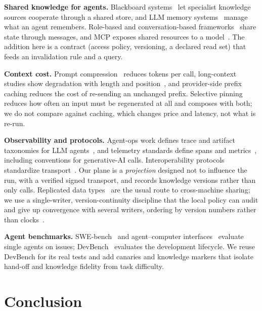 \documentclass[10pt,conference]{IEEEtran}
\theoremstyle{definition}
\begin{document}
\textbf{Shared knowledge for agents.} Blackboard systems~\cite{nii1986blackboard,erman1980hearsay} let
specialist knowledge sources cooperate through a shared store, and LLM memory
systems~\cite{packer2023memgpt,park2023generative} manage what an agent remembers. Role-based and
conversation-based frameworks~\cite{hong2024metagpt,qian2024chatdev,wu2024autogen,li2023camel,chen2024agentverse}
share state through messages, and MCP exposes shared resources to a model~\cite{mcp2024}. The addition here is a
contract (access policy, versioning, a declared read set) that feeds an invalidation rule and a query.

\textbf{Context cost.} Prompt compression~\cite{jiang2023llmlingua} reduces tokens per call, long-context studies
show degradation with length and position~\cite{liu2024lost}, and provider-side prefix caching reduces the cost
of re-sending an unchanged prefix. Selective pinning reduces how often an input must be regenerated at all and
composes with both; we do not compare against caching, which changes price and latency, not what is re-run.

\textbf{Observability and protocols.} Agent-ops work defines trace and artifact taxonomies for LLM
agents~\cite{dong2024agentops}, and telemetry standards define spans and metrics~\cite{opentelemetry}, including
conventions for generative-AI calls. Interoperability protocols standardize transport~\cite{mcp2024,a2a2025,ehtesham2025interop}.
Our plane is a \emph{projection} designed not to influence the run, with a verified signed transport, and records
knowledge versions rather than only calls. Replicated data types~\cite{shapiro2011crdt} are the usual route to
cross-machine sharing; we use a single-writer, version-continuity discipline that the local policy can audit and
give up convergence with several writers, ordering by version numbers rather than clocks~\cite{lamport1978time}.

\textbf{Agent benchmarks.} SWE-bench~\cite{jimenez2024swebench} and agent--computer
interfaces~\cite{yang2024sweagent} evaluate single agents on issues; DevBench~\cite{li2024devbench} evaluates the
development lifecycle. We reuse DevBench for its real tests and add canaries and knowledge markers that isolate
hand-off and knowledge fidelity from task difficulty.

\section{Conclusion}\label{sec:conclusion}
\end{document}
